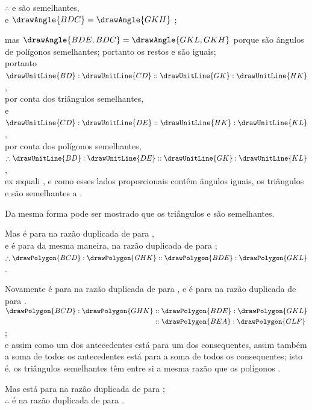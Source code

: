 \documentclass[booklanguage=brazilian]{byrnebook}
\begin{document}
\begin{center}
$\therefore$  e  são semelhantes,\\
e $\drawAngle{BDC} = \drawAngle{GKH}$ ;

mas $\drawAngle{BDE,BDC} = \drawAngle{GKL,GKH}$ porque são ângulos de polígonos semelhantes; portanto os restos  e  são iguais;\\
portanto $\drawUnitLine{BD} : \drawUnitLine{CD} :: \drawUnitLine{GK} : \drawUnitLine{HK}$,\\
por conta dos triângulos semelhantes,\\
e $\drawUnitLine{CD} : \drawUnitLine{DE} :: \drawUnitLine{HK} : \drawUnitLine{KL}$,\\
por conta dos polígonos semelhantes,\\
$\therefore \drawUnitLine{BD} : \drawUnitLine{DE} :: \drawUnitLine{GK} : \drawUnitLine{KL}$,\\
ex \ae quali , e como esses lados proporcionais contêm ângulos iguais, os triângulos  e  são semelhantes a .

Da mesma forma pode ser mostrado que os triângulos  e  são semelhantes.

Mas  é para  na razão duplicada de  para  ,\\
e  é para  da mesma maneira, na razão duplicada de  para ;\\
$\therefore \drawPolygon{BCD} : \drawPolygon{GHK} :: \drawPolygon{BDE} : \drawPolygon{GKL}$ .

Novamente  é para  na razão duplicada de  para , e  é para  na razão duplicada de  para .
$\begin{aligned}
\drawPolygon{BCD} : \drawPolygon{GHK} &:: \drawPolygon{BDE} : \drawPolygon{GKL} \\
&:: \drawPolygon{BEA} : \drawPolygon{GLF} \\
\end{aligned}$;\\
e assim como um dos antecedentes está para um dos consequentes, assim também a soma de todos os antecedentes está para a soma de todos os consequentes; isto é, os triângulos semelhantes têm entre si a mesma razão que os polígonos .

Mas  está para  na razão duplicada de  para ;\\
$\therefore$  é  na razão duplicada de  para .
\end{center}
\end{document}
